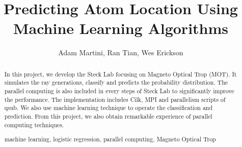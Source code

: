 \documentclass[runningheads,a4paper,11pt]{llncs}
\newcommand{\keywords}[1]{\par\addvspace\baselineskip
\noindent\keywordname\enspace\ignorespaces#1}
\begin{document}
\mainmatter  %

\title{Predicting Atom Location Using \\ Machine Learning Algorithms}


%
%
\author{Adam Martini, Ran Tian, Wes Erickson}


%
%

\maketitle

\begin{abstract} In this project, we develop the Steck Lab focusing on Magneto Optical Trop (MOT). It simulates the ray generations, classify and predicts the probability distribution. The parallel computing is also included in every steps of Steck Lab to significantly improve the performance. The implementation includes Cilk, MPI and parallelism scripts of qsub. We also use machine learning technique to operate the classification and prediction. From this project, we also obtain remarkable experience of parallel computing techniques. 
\keywords{machine learning, logistic regression, parallel computing, Magneto Optical Trop}
\end{abstract}

















\end{document}
